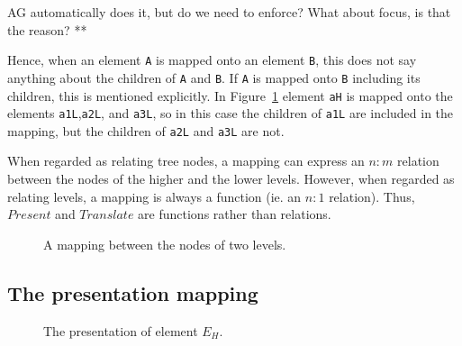 AG automatically does it, but do we need to enforce? What about focus, is that the reason?
**
\fromHere  %


\bc
Hence, when an element \verb|A| is mapped onto an element \verb|B|, this does not say anything about the children of \verb|A| and \verb|B|. If \verb|A| is mapped onto \verb|B| including its children, this is mentioned explicitly. In Figure~\ref{nodeMapping} element \verb|aH| is mapped onto the elements \verb|a1L|,\verb|a2L|, and \verb|a3L|, so in this case the children of \verb|a1L| are included in the mapping, but the children of \verb|a2L| and \verb|a3L| are not. 
\ec

\bc
When regarded as relating tree nodes, a mapping can express an $n:m$ relation between the nodes of the higher and the lower levels. However, when regarded as relating levels, a mapping is always a function (ie. an $n:1$ relation). Thus, $Present$ and $Translate$ are functions rather than relations.
\ec

\begin{figure}
\begin{center}
\begin{center}
\end{center}
\caption{A mapping between the nodes of two levels.}\label{nodeMapping} 
\end{center}
\end{figure}



%																
\subsection{The presentation mapping}

\begin{figure}
\begin{center}
\begin{center}
%                    
\end{center}
\caption{The presentation of element $E_H$.}\label{elementPresentation} 
\end{center}
\end{figure}

